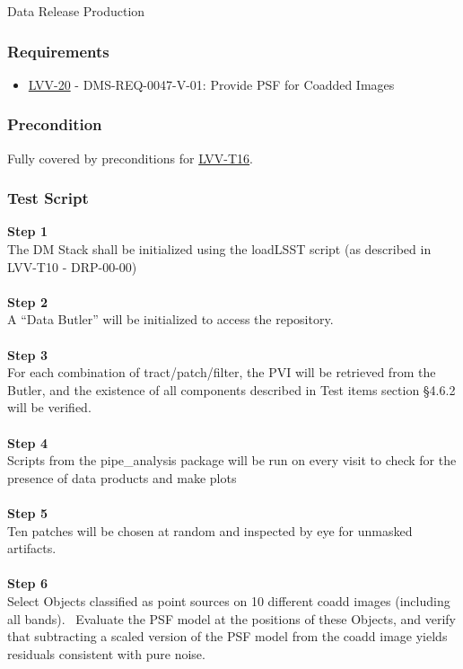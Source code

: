 Data Release Production~

\hypertarget{requirements-39}{%
\subsubsection{Requirements}\label{requirements-39}}

\begin{itemize}
\tightlist
\item
  \href{https://jira.lsstcorp.org/browse/LVV-20}{LVV-20} -
  DMS-REQ-0047-V-01: Provide PSF for Coadded Images
\end{itemize}

\hypertarget{precondition-2}{%
\subsubsection{Precondition}\label{precondition-2}}

Fully covered by preconditions for
\href{https://jira.lsstcorp.org/secure/Tests.jspa\#/testCase/LVV-T16}{LVV-T16}.

\hypertarget{test-script-39}{%
\subsubsection{Test Script}\label{test-script-39}}

\textbf{Step 1}\\
The DM Stack shall be initialized using the loadLSST script (as
described in LVV-T10 - DRP-00-00)\\
~\\
\textbf{Step 2}\\
A ``Data Butler'' will be initialized to access the repository.\\
~\\
\textbf{Step 3}\\
For each combination of tract/patch/filter, the PVI will be retrieved
from the Butler, and the existence of all components described in Test
items section §4.6.2 will be verified.\\
~\\
\textbf{Step 4}\\
Scripts from the pipe\_analysis package will be run on every visit to
check for the presence of data products and make plots\\
~\\
\textbf{Step 5}\\
Ten patches will be chosen at random and inspected by eye for unmasked
artifacts.\\
~\\
\textbf{Step 6}\\
Select Objects classified as point sources on 10 different coadd images
(including all bands). ~Evaluate the PSF model at the positions of these
Objects, and verify that subtracting a scaled version of the PSF model
from the coadd image yields residuals consistent with pure noise.\\
~\\

